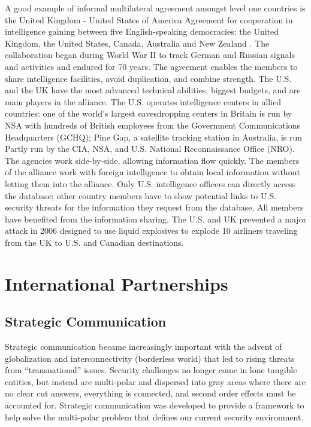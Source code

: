 \documentclass{report}
\begin{document}
A good example of informal multilateral agreement amongst level one countries is the United Kingdom - United States of America Agreement for cooperation in intelligence gaining between five English-speaking democracies: the United Kingdom, the United States, Canada, Australia and New Zealand \cite{Cox2012}. The collaboration began during World War II to track German and Russian signals and activities and endured for 70 years. The agreement enables the members to share intelligence facilities, avoid duplication, and combine strength. The U.S. and the UK have the most advanced technical abilities, biggest budgets, and are main players in the alliance. The U.S. operates intelligence centers in allied countries: one of the world's largest eavesdropping centers in Britain is run by NSA with hundreds of British employees from the Government Communications Headquarters (GCHQ); Pine Gap, a satellite tracking station in Australia, is run Partly run by the CIA, NSA, and U.S. National Reconnaissance Office (NRO). The agencies work side-by-side, allowing information flow quickly. The members of the alliance work with foreign intelligence to obtain local information without letting them into the alliance. Only U.S. intelligence officers can directly access the database; other country members have to show potential links to U.S. security threats for the information they request from the database. All members have benefited from the information sharing. The U.S. and UK prevented a major attack in 2006 designed to use liquid explosives to explode 10 airliners traveling from the UK to U.S. and Canadian destinations. 


\chapter[Appendix G: International Partnerships]{International Partnerships} \label{app:partners}

\section{Strategic Communication }



Strategic communication became increasingly important with the advent of globalization and interconnectivity (borderless world) that led to rising threats from \enquote{transnational} issues. Security challenges no longer come in lone tangible entities, but instead are multi-polar and dispersed into gray areas where there are no clear cut answers, everything is connected, and second order effects must be accounted for. Strategic communication was developed to provide a framework to help solve the multi-polar problem that defines our current security environment.
\end{document}
